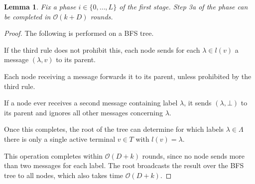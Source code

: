 \documentclass[letterpaper,11pt]{article}
\newtheorem{lemma}[theorem]{Lemma}
\newcommand{\BO}{\mathcal{O}}
\newcommand{\Comp}{\lambda}
\begin{document}
\begin{lemma}\label{lemma:stage1_3a}
Fix a phase $i\in \{0,\ldots,L\}$ of the first stage. Step 3a of the phase can
be completed in $\BO(k+D)$ rounds.
\end{lemma}
\begin{proof}
The following is performed on a BFS tree.
\begin{compactitem}
\item If the third rule does not prohibit this, each node sends for each
$\Comp\in l(v)$ a message $(\Comp,v)$ to its parent.
\item Each node receiving a message forwards it to its parent, unless prohibited
by the third rule.
\item If a node ever receives a second message containing label
$\Comp$, it sends $(\Comp,\bot)$ to its parent and ignores all other messages
concerning $\Comp$.
\item Once this completes, the root of the tree can determine for which labels
$\Comp \in \Lambda$ there is only a single active terminal $v\in T$ with
$l(v)=\Comp$.
\end{compactitem}
This operation completes within $\BO(D+k)$ rounds, since no node sends more than
two messages for each label. The root broadcasts the result over the BFS tree to
all nodes, which also takes time $\BO(D+k)$.
\end{proof}
\end{document}

